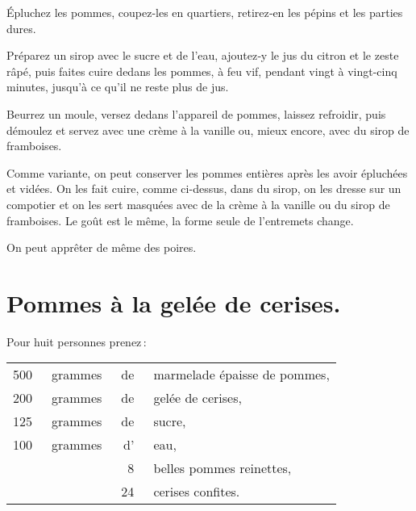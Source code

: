 Épluchez les pommes, coupez-les en quartiers, retirez‑en les pépins et les
parties dures.

Préparez un sirop avec le sucre et de l'eau, ajoutez‑y le jus du citron et le
zeste râpé, puis faites cuire dedans les pommes, à feu vif, pendant vingt
à vingt-cinq minutes, jusqu'à ce qu'il ne reste plus de jus.

Beurrez un moule, versez dedans l'appareil de pommes, laissez refroidir, puis
démoulez et servez avec une crème à la vanille ou, mieux encore, avec du sirop
de framboises.

\sk

Comme variante, on peut conserver les pommes entières après les avoir épluchées
et vidées. On les fait cuire, comme ci-dessus, dans du sirop, on les dresse sur
un compotier et on les sert masquées avec de la crème à la vanille ou du sirop
de framboises. Le goût est le même, la forme seule de l’entremets change.

\sk

On peut apprêter de même des poires.

\section*{\centering Pommes à la gelée de cerises.}
{}

Pour huit personnes prenez :

\footnotesize
\begin{longtable}{rrrp{16em}}
    500 & grammes & de & marmelade épaisse de pommes,                                                     \\
    200 & grammes & de & gelée de cerises,                                                                \\
    125 & grammes & de & sucre,                                                                           \\
    100 & grammes & d' & eau,                                                                             \\
        &         &  8 & belles pommes reinettes,                                                         \\
        &         & 24 & cerises confites.                                                                \\
\end{longtable}
\normalsize

